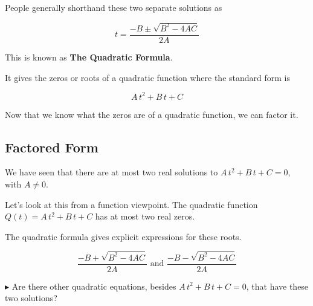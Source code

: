 \documentclass{ximera}
\begin{document}
People generally shorthand these two separate solutions as



\[ t  =   \frac{-B \pm \sqrt{B^2 - 4 A C}}{2A}      \]


This is known as \textbf{The Quadratic Formula}.


It gives the zeros or roots of a quadratic function where the standard form is 

\[
A \, t^2 + B \, t + C
\]



Now that we know what the zeros are of a quadratic function, we can factor it.




























\subsection*{Factored Form}










We have seen that there are at most two real solutions to $A \, t^2 + B \, t + C = 0$, with $A \ne 0$. 

Let's look at this from a function viewpoint.  The quadratic function  $Q(t) = A \, t^2 + B \, t + C$ has at most two real zeros.  

The quadratic formula gives explicit expressions for these roots.


\[   \frac{-B + \sqrt{B^2 - 4 A C}}{2A}     \text{ and }    \frac{-B - \sqrt{B^2 - 4 A C}}{2A}   \]





$\blacktriangleright$  Are there other quadratic equations, besides $A \, t^2 + B \, t + C = 0$, that have these two solutions?
\end{document}

